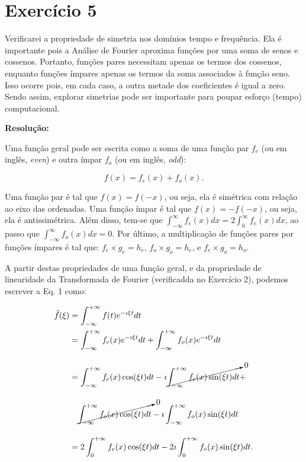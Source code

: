 
\section*{\large Exercício 5}
%

Verificarei a propriedade de simetria nos domínios tempo e frequência. Ela é importante pois a Análise de Fourier aproxima funções por uma soma de senos e cossenos. Portanto, funções pares necessitam apenas os termos dos cossenos, enquanto funções ímpares apenas os termos da soma associados à função seno. Isso ocorre pois, em cada caso, a outra metade dos coeficientes é igual a zero. Sendo assim, explorar simetrias pode ser importante para poupar esforço (tempo) computacional. 

\textbf{Resolução:}

Uma função geral pode ser escrita como a soma de uma função par $f_{e}$ (ou em inglês, \textit{even}) e outra ímpar $f_{o}$ (ou em inglês, \textit{odd}):

\begin{equation*}
f(x) = f_{e}(x) + f_{o}(x).
\end{equation*}

Uma função par é tal que $f(x) =  f(-x)$, ou seja, ela é simétrica com relação ao eixo das ordenadas. Uma função ímpar é tal que $f(x) =  -f(-x)$, ou seja, ela é antissimétrica. Além disso, tem-se que $\int_{-\infty}^{\infty}f_{e}(x)dx = 2 \int_{0}^{\infty}f_{e}(x)dx$, ao passo que $\int_{-\infty}^{\infty}f_{o}(x)dx = 0$. Por último, a multiplicação de funções pares por funções ímpares é tal que: $f_{e} \times g_{e} = h_{e}$, $f_{o} \times g_{o} = h_{e}$, e $f_{e} \times g_{o} = h_{o}$.

A partir destas propriedades de uma função geral, e da propriedade de linearidade da Transformada de Fourier (verificadda no Exercício 2), podemos escrever a Eq. 1 como:

\begin{align*}
\hat{f}(\xi) &= \int_{-\infty}^{+\infty} f(t) e^{-\imath \xi t}d t \\
 &= \int_{-\infty}^{+\infty} f_{e}(x) e^{-\imath \xi t}d t  + \int_{-\infty}^{+\infty}  f_{o}(x) e^{-\imath \xi t}d t \\[10pt]
 &= \int_{-\infty}^{+\infty} f_{e}(x) \cos(\xi t)d t  - \imath \cancelto{0}{\int_{-\infty}^{+\infty}  f_{e}(x) \sin(\xi t)d t} + \\[10pt]
 & \quad \cancelto{0}{\int_{-\infty}^{+\infty} f_{o}(x) \cos(\xi t)d t} - \imath \int_{-\infty}^{+\infty}  f_{o}(x) \sin(\xi t)d t \\[10pt]
  &= 2 \int_{0}^{+\infty} f_{e}(x) \cos(\xi t)d t - 2 \imath \int_{0}^{+\infty}  f_{o}(x) \sin(\xi t)d t.
\end{align*}

